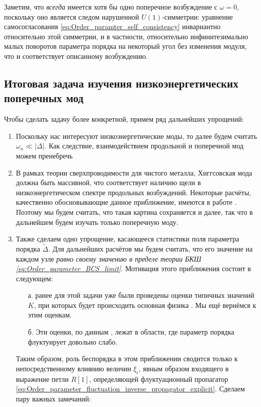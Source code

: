 Заметим, что \textit{всегда} имеется хотя бы одно поперечное возбуждение с $\omega = 0$, поскольку оно является следом нарушенной $U(1)$-симметрии: уравнение самосогласования \eqref{eq:Order_paramter_self_consistency} инвариантно относительно этой симметрии, и в частности, относительно инфинитезимально малых поворотов параметра порядка на некоторый угол без изменения модуля, что и соответствует описанному возбуждению.


\subsection{Итоговая задача изучения низкоэнергетических поперечных мод}
Чтобы сделать задачу более конкретной, примем ряд дальнейших упрощений:
\begin{enumerate}
	\item Поскольку нас интересуют низкоэнергетические моды, то далее будем считать $\omega_n \ll |\Delta|$. Как следствие, взаимодействием продольной и поперечной мод можем пренебречь
	\item В рамках теории сверхпроводимости для чистого металла, Хиггсовская мода должна быть массивной, что соответствует наличию щели в низкоэнергетическом спектре продольных возбуждений. Некоторые расчёты, качественно обосновывающие данное приближение, имеются в работе \cite{Shtyk_Feigelman_2017}. Поэтому мы будем считать, что такая картина сохраняется и далее, так что в дальнейшем будем изучать только поперечную моду. 
	\item Также сделаем одно упрощение, касающееся статистики поля параметра порядка $\widetilde{\Delta}$. Для дальнейших расчётов мы будем считать, что его значение на каждом узле \textit{равно своему значению в пределе теории БКШ \eqref{eq:Order_parameter_BCS_limit}}. Мотивация этого приближения состоит в следующем: 
	\begin{enumerate}
		\item[а.] ранее для этой задачи уже были проведены оценки типичных значений $K$, при которых будет происходить основная физика \cite{FI_microwave}. Мы ещё вернёмся к этим оценкам.
		\item[б.] Эти оценки, по данным \cite{Feigelman_et_al_2010}, лежат в области, где параметр порядка флуктуирует довольно слабо. 
	\end{enumerate}
	Таким образом, роль беспорядка в этом приближении сводится только к непосредственному влиянию величин $\xi_i$, явным образом входящего в выражение петли $R[1]$, определяющей флуктуационный пропагатор \eqref{eq:Order_parameter_fluctuation_inverse_propagator_explicit}. Сделаем пару важных замечаний:

\end{enumerate}
